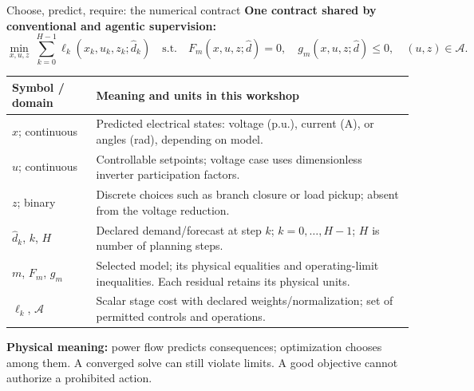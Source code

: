 \begin{frame}[t]{Choose, predict, require: the numerical contract}
\small
\textbf{One contract shared by conventional and agentic supervision:}
\[
\min_{x,u,z}\ \sum_{k=0}^{H-1}\ell_k(x_k,u_k,z_k;\hat d_k)
\quad\text{s.t.}\quad F_m(x,u,z;\hat d)=0,\quad g_m(x,u,z;\hat d)\leq0,\quad (u,z)\in\mathcal A.
\]
\footnotesize
\renewcommand{\arraystretch}{1.02}
\begin{tabular}{@{}>{\raggedright\arraybackslash}p{.20\linewidth}>{\raggedright\arraybackslash}p{.72\linewidth}@{}}
\toprule Symbol / domain & Meaning and units in this workshop \\
\midrule
$x$; continuous & Predicted electrical states: voltage (p.u.), current (A), or angles (rad), depending on model. \\
$u$; continuous & Controllable setpoints; voltage case uses dimensionless inverter participation factors. \\
$z$; binary & Discrete choices such as branch closure or load pickup; absent from the voltage reduction. \\
$\hat d_k$, $k$, $H$ & Declared demand/forecast at step $k$; $k=0,\ldots,H-1$; $H$ is number of planning steps. \\
$m$, $F_m$, $g_m$ & Selected model; its physical equalities and operating-limit inequalities. Each residual retains its physical units. \\
$\ell_k$, $\mathcal A$ & Scalar stage cost with declared weights/normalization; set of permitted controls and operations. \\
\bottomrule
\end{tabular}
\smallskip\par
\textbf{Physical meaning:} power flow predicts consequences; optimization chooses among them. A converged solve can still violate limits. A good objective cannot authorize a prohibited action.
\end{frame}

